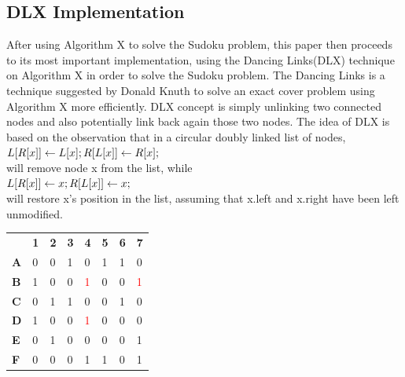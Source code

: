 \documentclass[a4paper,oneside,11pt]{report}
\newcounter{row}
\newcounter{col}
\begin{document}
\subsection{DLX Implementation}
After using Algorithm X to solve the Sudoku problem, this paper then proceeds to its most important implementation, using the Dancing Links(DLX) technique on Algorithm X in order to solve the Sudoku problem. The Dancing Links is a technique suggested by Donald Knuth to solve an exact cover problem using Algorithm X more efficiently. DLX concept is simply unlinking two connected nodes and also potentially link back again those two nodes. The idea of DLX is based on the observation that in a circular doubly linked list of nodes,\\
$L[R[x]] \leftarrow L[x];\\
R[L[x]] \leftarrow R[x];$\\
will remove node x from the list, while\\
$L[R[x]] \leftarrow x;\\
R[L[x]] \leftarrow x;$\\
will restore x’s position in the list, assuming that x.left and x.right have been left unmodified.
\begin{center}
\begin{tabular}{ m{0.5cm}  m{0.5cm} m{0.5cm} m{0.5cm} m{0.5cm} m{0.5cm} m{0.5cm} m{0.5cm}} 
& \textbf{1} & \textbf{2} & \textbf{3} & \textbf{4} & \textbf{5} & \textbf{6} & \textbf{7}\\ 
\textbf{A} & 0 & 0 & 1 & 0 & 1 & 1 & 0\\ 
\textbf{B} & 1 & 0 & 0 & \textcolor{red}{1} & 0 & 0 & \textcolor{red}{1}\\ 
\textbf{C} & 0 & 1 & 1 & 0 & 0 & 1 & 0\\
\textbf{D} & 1 & 0 & 0 & \textcolor{red}{1} & 0 & 0 & 0\\
\textbf{E} & 0 & 1 & 0 & 0 & 0 & 0 & 1\\
\textbf{F} & 0 & 0 & 0 & 1 & 1 & 0 & 1\\
\end{tabular}
\end{center}
\end{document}
